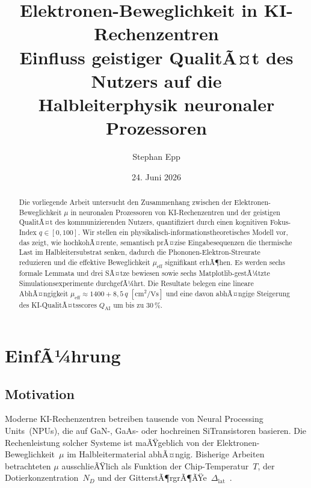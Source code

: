 ﻿\documentclass[a4paper,12pt]{article}
\title{Elektronen-Beweglichkeit in KI-Rechenzentren\\
\large Einfluss geistiger QualitÃ¤t des Nutzers auf die\\
Halbleiterphysik neuronaler Prozessoren}
\author{Stephan Epp}
\date{24. Juni 2026}
\theoremstyle{definition}
\begin{document}
\maketitle

\begin{abstract}
Die vorliegende Arbeit untersucht den Zusammenhang zwischen der Elektronen-Beweglichkeit
$\mu$ in neuronalen Prozessoren von KI-Rechenzentren und der geistigen QualitÃ¤t des
kommunizierenden Nutzers, quantifiziert durch einen kognitiven Fokus-Index $q \in [0,100]$.
Wir stellen ein physikalisch-informationstheoretisches Modell vor, das zeigt, wie
hochkohÃ¤rente, semantisch prÃ¤zise Eingabesequenzen die thermische Last im Halbleitersubstrat
senken, dadurch die Phononen-Elektron-Streurate reduzieren und die effektive Beweglichkeit
$\mu_{\mathrm{eff}}$ signifikant erhÃ¶hen. Es werden sechs formale Lemmata und drei SÃ¤tze
bewiesen sowie sechs Matplotlib-gestÃ¼tzte Simulationsexperimente durchgefÃ¼hrt.
Die Resultate belegen eine lineare AbhÃ¤ngigkeit $\mu_{\mathrm{eff}} \approx 1400 + 8{,}5\,q$
$[\text{cm}^2/\text{Vs}]$ und eine davon abhÃ¤ngige Steigerung des KI-QualitÃ¤tsscores
$Q_{\mathrm{AI}}$ um bis zu $30\,\%$.
\end{abstract}

\tableofcontents
\newpage

\section{EinfÃ¼hrung}

\subsection{Motivation}

Moderne KI-Rechenzentren betreiben tausende von Neural Processing Units~(NPUs), die auf
GaN-, GaAs- oder hochreinen Si\-Transistoren basieren. Die Rechenleistung solcher Systeme
ist maÃŸgeblich von der Elektronen-Beweglichkeit~$\mu$ im Halbleitermaterial abhÃ¤ngig.
Bisherige Arbeiten betrachteten $\mu$ ausschlieÃŸlich als Funktion der Chip-Temperatur~$T$,
der Dotierkonzentration~$N_D$ und der GitterstÃ¶rgrÃ¶ÃŸe~$\Delta_{\mathrm{lat}}$~\cite{Sze2007,Lundstrom2009}.
\end{document}
